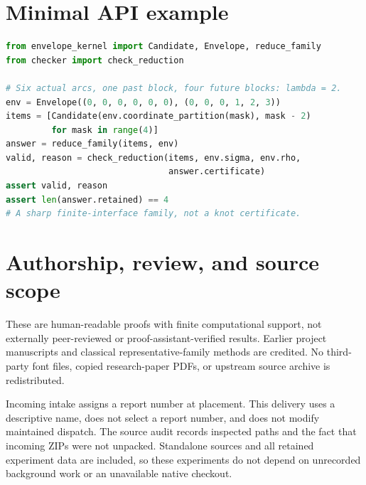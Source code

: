 \documentclass[11pt,a4paper]{article}
\theoremstyle{definition}
\theoremstyle{remark}
\begin{document}
\section{Minimal API example}
\begin{lstlisting}[language=Python]
from envelope_kernel import Candidate, Envelope, reduce_family
from checker import check_reduction

# Six actual arcs, one past block, four future blocks: lambda = 2.
env = Envelope((0, 0, 0, 0, 0, 0), (0, 0, 0, 1, 2, 3))
items = [Candidate(env.coordinate_partition(mask), mask - 2)
         for mask in range(4)]
answer = reduce_family(items, env)
valid, reason = check_reduction(items, env.sigma, env.rho,
                                answer.certificate)
assert valid, reason
assert len(answer.retained) == 4
# A sharp finite-interface family, not a knot certificate.
\end{lstlisting}

\section{Authorship, review, and source scope}
These are human-readable proofs with finite computational support, not externally
peer-reviewed or proof-assistant-verified results. Earlier project manuscripts and
classical representative-family methods are credited. No third-party font files,
copied research-paper PDFs, or upstream source archive is redistributed.

Incoming intake assigns a report number at placement. This delivery uses a descriptive
name, does not select a report number, and does not modify maintained dispatch. The
source audit records inspected paths and the fact that incoming ZIPs were not unpacked.
Standalone sources and all retained experiment data are included, so these experiments
do not depend on unrecorded background work or an unavailable native checkout.
\end{document}
